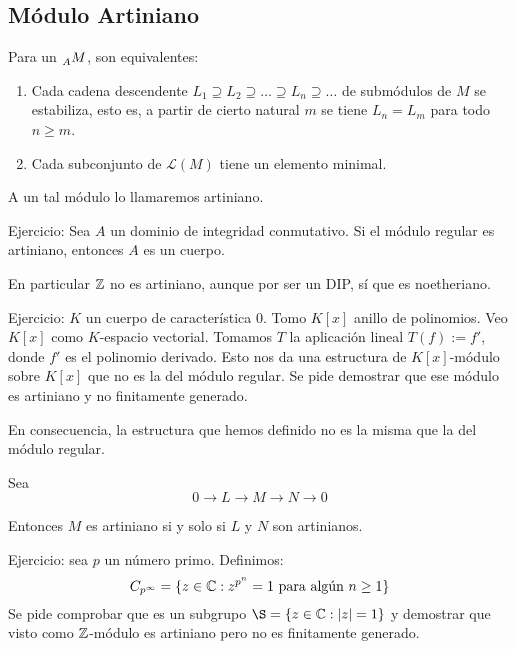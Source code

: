 \subsection{Módulo Artiniano}

\begin{df}
  Para un \(\prescript{}{A}{M}\), son equivalentes:
  \begin{enumerate}
    \item Cada cadena descendente
      \(L_1\supseteq L_2\supseteq\ldots\supseteq L_n\supseteq\ldots\)
      de submódulos de \(M\)
      se estabiliza, esto es, a partir de cierto natural \(m\)
      se tiene \(L_n=L_m\) para todo \(n\ge m\).
    \item Cada subconjunto de \(\mathcal{L}(M)\) tiene un elemento
      minimal.
  \end{enumerate}
  A un tal módulo lo llamaremos artiniano.
\end{df}

Ejercicio: Sea \(A\) un dominio de integridad conmutativo. Si el
módulo regular es artiniano, entonces \(A\) es un cuerpo.

En particular \(\mathbb{Z}\) no es artiniano, aunque por ser un DIP, sí que
es noetheriano.

Ejercicio: \(K\) un cuerpo de característica 0. Tomo \(K[x]\) anillo
de polinomios. Veo \(K[x]\) como \(K\)-espacio vectorial.
Tomamos \(T\) la aplicación lineal \(T(f):=f'\), donde \(f'\) es el
polinomio derivado. Esto nos da una estructura de \(K[x]\)-módulo
sobre \(K[x]\) que no es la del módulo regular. Se pide demostrar
que ese módulo es artiniano y no finitamente generado.

En consecuencia, la estructura que hemos definido no es la misma
que la del módulo regular.

\begin{prop}
  Sea \[0\longrightarrow L\longrightarrow M\longrightarrow N\longrightarrow
  0\]

  Entonces \(M\) es artiniano si y solo si \(L\) y \(N\) son artinianos.
\end{prop}

Ejercicio: sea \(p\) un número primo. Definimos:
\[
  C_{p^\infty}=\{z\in\mathbb{C}:z^{p^n}=1\textrm{ para algún } n\ge1\}
\]
Se pide comprobar que es un subgrupo \(\S=\{z\in\C:\md{z}=1\}\) y demostrar
que visto como \(\mathbb{Z}\)-módulo es artiniano pero no es finitamente generado.

